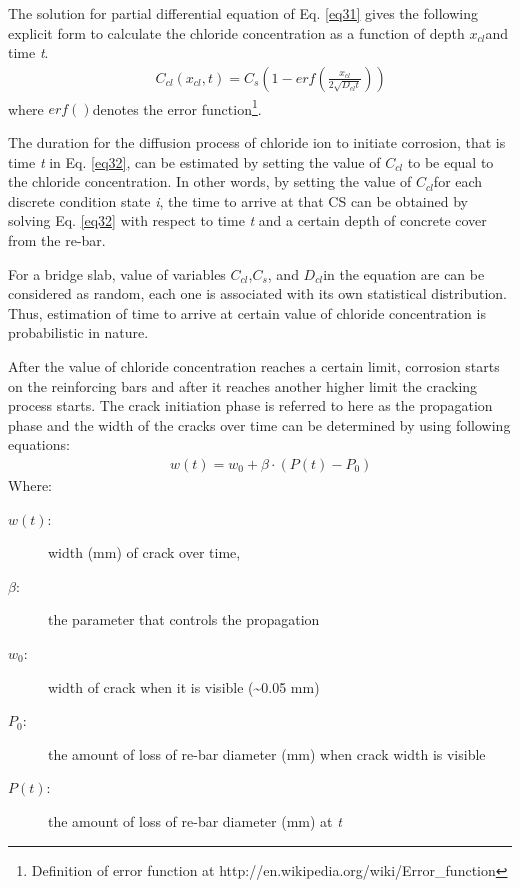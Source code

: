 The solution for partial differential equation of Eq. \eqref{eq31} gives the following explicit form to calculate the chloride concentration as a function of depth ${x_{cl}}$and time \textit{t}.
\begin{eqnarray}
      && {C_{cl}}({x_{cl}},t) = {C_s}\left( {1 - erf\left( {\frac{{{x_{cl}}}}{{2\sqrt {{D_{cl}}t} }}} \right)} \right) \label{eq32}
\end{eqnarray}
where  $erf\left(  \right)$denotes the error function\footnote{Definition of error function at http://en.wikipedia.org/wiki/Error\_function}. 

The duration for the diffusion process of chloride ion to initiate corrosion, that is time \textit{t} in Eq. \eqref{eq32}, can be estimated by setting the value of ${C_{cl}}$ to be equal to the chloride concentration. In other words, by setting the value of ${C_{cl}}$for each discrete condition state \textit{i}, the time to arrive at that CS can be obtained by solving Eq. \eqref{eq32} with respect to time \textit{t} and a certain depth of concrete cover from the re-bar.

For a bridge slab, value of variables ${C_{cl}}$,${C_s}$, and ${D_{cl}}$in the equation are can be considered as random, each one is associated with its own statistical distribution. Thus, estimation of time to arrive at certain value of chloride concentration is probabilistic in nature.

After the value of chloride concentration reaches a certain limit, corrosion starts on the reinforcing bars and after it reaches another higher limit the cracking process starts. The crack initiation phase is referred to here as the propagation phase and the width of the cracks over time can be determined by using following equations:
\begin{eqnarray}
      && w(t) = {w_0} + \beta  \cdot \left( {P(t) - {P_0}} \right) \label{eq33}
\end{eqnarray}
Where:
\begin{adjustwidth}{1cm}{}
\begin{description}
\item[$w(t)$:] width (mm) of crack over time,
\item[$\beta $:] the parameter that controls the propagation
\item[${w_0}$:] width of crack when it is visible (\textasciitilde{}0.05 mm)
\item[${P_0}$:] the amount of loss of re-bar diameter (mm) when crack width is visible 
\item [$P(t)$:] the amount of loss of re-bar diameter (mm) at \textit{t}
\end{description}
\end{adjustwidth}

